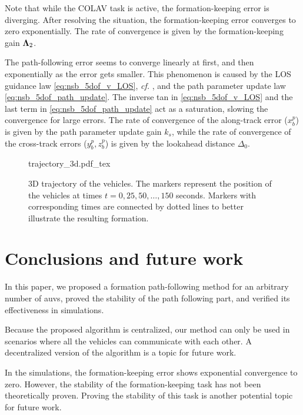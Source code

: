 Note that while the COLAV task is active, the formation-keeping error is diverging.
After resolving the situation, the formation-keeping error converges to zero exponentially.
The rate of convergence is given by the formation-keeping gain $\bm{\Lambda}_2$.

The path-following error seems to converge linearly at first, and then exponentially as the error gets smaller.
This phenomenon is caused by the LOS guidance law \eqref{eq:nsb_5dof_v_LOS}, \emph{cf.} \cite{fossen_uniform_2014}, and the path parameter update law \eqref{eq:nsb_5dof_path_update}.
The inverse tan in \eqref{eq:nsb_5dof_v_LOS} and the last term in \eqref{eq:nsb_5dof_path_update} act as a saturation, slowing the convergence for large errors.
The rate of convergence of the along-track error ($x_b^p$) is given by the path parameter update gain $k_{s}$, while the rate of convergence of the cross-track errors ($y_b^p, z_b^p$) is given by the lookahead distance $\Delta_0$.

\begin{figure}[t]
    \centering
    \def\svgwidth{.8\textwidth}
    {trajectory_3d.pdf_tex}
    \caption{3D trajectory of the vehicles. The markers represent the position of the vehicles at times $t = 0, 25, 50, \ldots, 150$ seconds. Markers with corresponding times are connected by dotted lines to better illustrate the resulting formation.}
    \label{fig:nsb_5dof_trajectory}
\end{figure}

\section{Conclusions and future work}
\label{sec:nsb_5dof_conclusion}


In this paper, we proposed a formation path-following method for an arbitrary number of \glspl{auv}, proved the stability of the path following part, and verified its effectiveness in simulations.

Because the proposed algorithm is centralized, our method can only be used in scenarios where all the vehicles can communicate with each other.
A decentralized version of the algorithm is a topic for future work.

In the simulations, the formation-keeping error shows exponential convergence to zero.
However, the stability of the formation-keeping task has not been theoretically proven.
Proving the stability of this task is another potential topic for future work.
